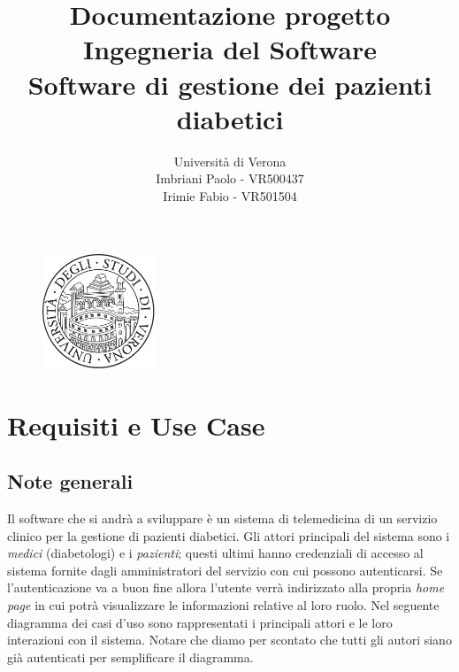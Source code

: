 \documentclass[a4paper]{article}
\begin{document}
\title{Documentazione progetto Ingegneria del Software\\[1ex]
  \large Software di gestione dei pazienti diabetici
}

\author{
  \vspace{0.8cm}
  Università di Verona\\
  Imbriani Paolo - VR500437\\
  Irimie Fabio - VR501504
}

\begin{figure}
  \centering
  \includegraphics[width=0.3\textwidth]{UniversityofVerona}
\end{figure}

\maketitle 

\pagebreak

\tableofcontents

\pagebreak

\section{Requisiti e Use Case}

\subsection{Note generali}

Il software che si andrà a sviluppare è un sistema di telemedicina di un servizio clinico per la gestione
di pazienti diabetici. Gli attori principali del sistema sono i \textit{medici} (diabetologi) e i \textit{pazienti}; questi ultimi
hanno credenziali di accesso al sistema fornite dagli amministratori del servizio con cui possono autenticarsi.
Se l'autenticazione va a buon fine allora l'utente verrà indirizzato alla propria \textit{home page} in cui potrà
visualizzare le informazioni relative al loro ruolo. Nel seguente diagramma dei casi d'uso sono rappresentati
i principali attori e le loro interazioni con il sistema. Notare che diamo per scontato che tutti gli autori siano già autenticati
per semplificare il diagramma.
\end{document}
